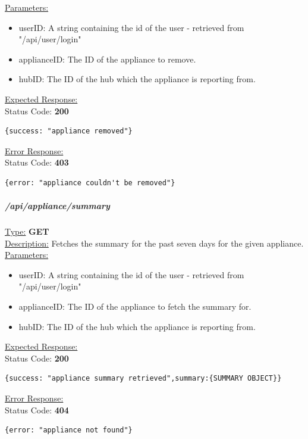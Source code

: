 \documentclass[draft,preprint,12pt,3p]{elsarticle}
\newcommand{\forceindent}{\leavevmode{\parindent=1em\indent}}
\begin{document}
\underline{Parameters:}
\begin{itemize}
\item userID: A string containing the id of the user - retrieved from "/api/user/login"

\item applianceID: The ID of the appliance to remove.

\item hubID: The ID of the hub which the appliance is reporting from.

\end{itemize}
\underline{Expected Response:}\\[5pt]
\forceindent Status Code: \textbf{200} \\
\begin{verbatim}
{success: "appliance removed"}
\end{verbatim}
\underline{Error Response:}\\[5pt]
\forceindent Status Code: \textbf{403} \\
\begin{verbatim}
{error: "appliance couldn't be removed"}
\end{verbatim}

\subparagraph*{/api/appliance/summary}
\underline{Type:} \textbf{GET}\\

\underline{Description:} Fetches the summary for the past seven days for the given appliance.\\

\underline{Parameters:}
\begin{itemize}
\item userID: A string containing the id of the user - retrieved from "/api/user/login"

\item applianceID: The ID of the appliance to fetch the summary for.

\item hubID: The ID of the hub which the appliance is reporting from.

\end{itemize}
\underline{Expected Response:}\\[5pt]
\forceindent Status Code: \textbf{200} \\
\begin{verbatim}
{success: "appliance summary retrieved",summary:{SUMMARY OBJECT}}
\end{verbatim}
\underline{Error Response:}\\[5pt]
\forceindent Status Code: \textbf{404} \\
\begin{verbatim}
{error: "appliance not found"}
\end{verbatim}
\end{document}
